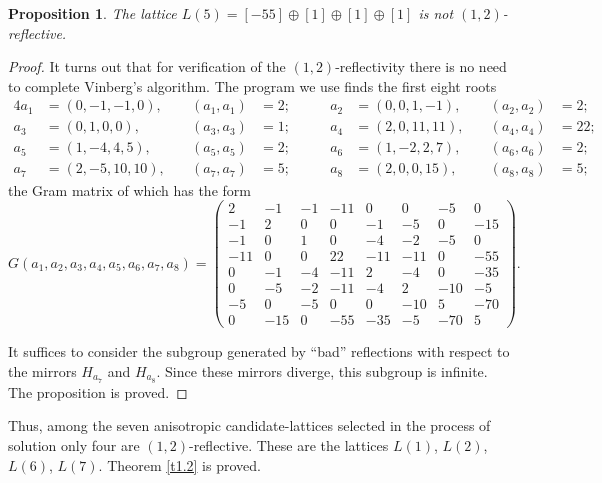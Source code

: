 \documentclass[reqno,12pt]{amsart}
\newtheorem{proposition}{\indent Proposition}%
\begin{document}
\begin{proposition}
\label{p6.2}
The lattice  $L(5)=[-55] \oplus [1] \oplus [1] \oplus [1]$ is not 
$(1{,}2)$-reflective. 
\end{proposition}

\begin{proof}
It turns out that for verification of the $(1{,}2)$-reflectivity there is no need to complete Vinberg's 
algorithm. The program we use finds the first eight roots 
\begin{alignat*}{4}
a_1&=(0, -1, -1, 0), &\quad (a_1,a_1)&=2;&\qquad a_2&=(0, 0, 1, -1), &\quad (a_2,a_2)&=2;
\\
a_3&=(0, 1, 0, 0), &\quad (a_3,a_3)&=1;&\qquad a_4&=(2, 0, 11, 11), &\quad (a_4,a_4)&=22;
\\
a_5&=(1, -4, 4, 5), &\quad (a_5,a_5)&=2;&\qquad a_6&=(1, -2, 2, 7), &\quad (a_6,a_6)&=2;
\\
a_7&=(2, -5, 10, 10), &\quad (a_7,a_7)&=5;&\qquad a_8&=(2, 0, 0, 15), &\quad
(a_8,a_8)&=5;
\end{alignat*}
the Gram matrix of which has the form
$$
G(a_1,a_2,a_3,a_4,a_5,a_6,a_7,a_8){=}\!\!\begin{pmatrix}
2 & -1 & -1 & -11 & 0 & 0 &-5 & 0\\
 -1 & 2 & 0 & 0 & -1 & -5 & 0 &-15\\
-1 & 0 & 1 & 0 & -4 &-2 &-5 & 0 \\
-11 & 0 & 0 & 22 & -11 & -11 & 0 & -55\\
0 & -1& -4 & -11 & 2 & -4 & 0 & -35 \\
 0 & -5 & -2& -11& -4 & 2 & -10 & -5\\
-5 & 0& -5 & 0 & 0 &-10 & 5 &-70\\
0 & -15 & 0 & -55 & -35 & -5 & -70 & 5
\end{pmatrix}.
$$

It suffices to consider the subgroup generated by ``bad'' reflections with respect to the mirrors 
 $H_{a_7}$ and $H_{a_8}$. Since these mirrors diverge, this subgroup is infinite. The proposition is 
 proved. 
\end{proof}

Thus, among the seven anisotropic candidate-lattices selected in the process of solution only four 
are $(1{,}2)$-reflective. These are the lattices $L(1)$, $L(2)$, $L(6)$, $L(7)$. 
Theorem \ref{t1.2} is proved. 

\end{document}
